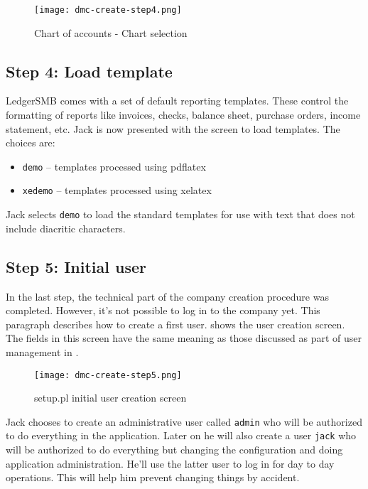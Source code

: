 \begin{figure}[h]
\centering
\texttt{[image: dmc-create-step4.png]}
\caption{Chart of accounts - Chart selection}
\label{fig:setup-step4}
\end{figure}

\subsection{Step 4: Load template}
\label{subsec-create-setup-load-template}

LedgerSMB comes with a set of default reporting templates. 
These control the formatting of reports like invoices, checks, balance sheet, purchase orders, income statement, etc. 
Jack is now presented with the screen to load templates. The choices are:
\begin{itemize}
	\item  \texttt{demo} -- templates processed using pdflatex
	\item  \texttt{xedemo} -- templates processed using xelatex
\end{itemize}

Jack selects  \texttt{demo} to load the standard templates for use with text that does not include \glspl{diacritic character}.

\subsection{Step 5: Initial user}
\label{subsec-create-setup-initial-user}

In the last step, the technical part of the company creation procedure was completed.
However, it's not possible to log in to the company yet. This paragraph describes how to
create a first user.
 shows the user creation screen. The fields in this screen have
the same meaning as those discussed as part of user management in .

\begin{figure}[h]
\centering
\texttt{[image: dmc-create-step5.png]}
\caption{setup.pl initial user creation screen}
\label{fig:setup-step5}
\end{figure}

Jack chooses to create an administrative user called \texttt{admin} who will be authorized
to do everything in the application. Later on he will also create a user \texttt{jack}
who will be authorized to do everything but changing the configuration and doing application administration.
He'll use the latter user to log in for day to day operations. This will help him prevent
changing things by accident.

